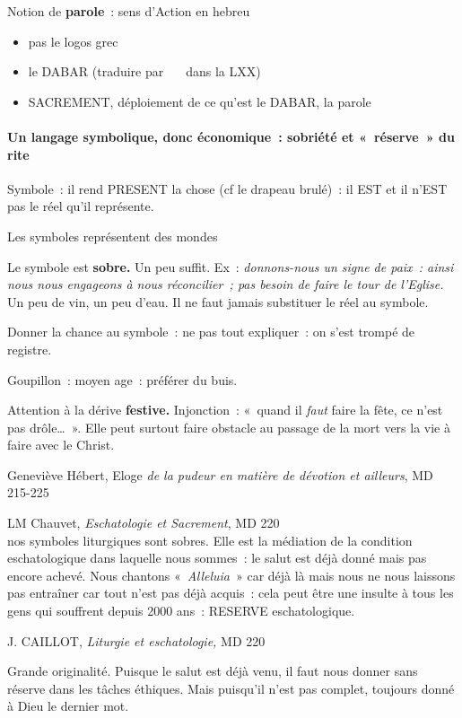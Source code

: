 Notion de \textbf{parole}~: sens d'Action en hebreu

\begin{itemize}
\item
  pas le logos grec
\item
  le DABAR (traduire par  dans la LXX)
\item
  SACREMENT, déploiement de ce qu'est le DABAR, la parole
\end{itemize}



    \paragraph{Un langage symbolique, donc économique~: sobriété et
    «~réserve~» du
    rite}

Symbole~: il rend PRESENT la chose (cf le drapeau brulé)~: il EST et il
n'EST pas le réel qu'il représente.

Les symboles représentent des mondes

Le symbole est \textbf{sobre.} Un peu suffit. Ex~: \emph{donnons-nous un
signe de paix~: ainsi nous nous engageons à nous réconcilier~; pas
besoin de faire le tour de l'Eglise.} Un peu de vin, un peu d'eau. Il ne
faut jamais substituer le réel au symbole.

Donner la chance au symbole~: ne pas tout expliquer~: on s'est trompé de
registre.

Goupillon~: moyen age~: préférer du buis.

Attention à la dérive \textbf{festive.} Injonction~: «~quand il
\emph{faut} faire la fête, ce n'est pas drôle\ldots~». Elle peut surtout
faire obstacle au passage de la mort vers la vie à faire avec le Christ.

Geneviève Hébert, Eloge \emph{de la pudeur en matière de dévotion et
ailleurs}, MD 215-225

LM Chauvet, \emph{Eschatologie et Sacrement}, MD 220\\
nos symboles liturgiques sont sobres. Elle est la médiation de la
condition eschatologique dans laquelle nous sommes~: le salut est déjà
donné mais pas encore achevé. Nous chantons «~\emph{Alleluia}~» car déjà
là mais nous ne nous laissons pas entraîner car tout n'est pas déjà
acquis~: cela peut être une insulte à tous les gens qui souffrent depuis
2000 ans~: RESERVE eschatologique.

J. CAILLOT, \emph{Liturgie et eschatologie,} MD 220

Grande originalité. Puisque le salut est déjà venu, il faut nous donner
sans réserve dans les tâches éthiques. Mais puisqu'il n'est pas complet,
toujours donné à Dieu le dernier mot.

